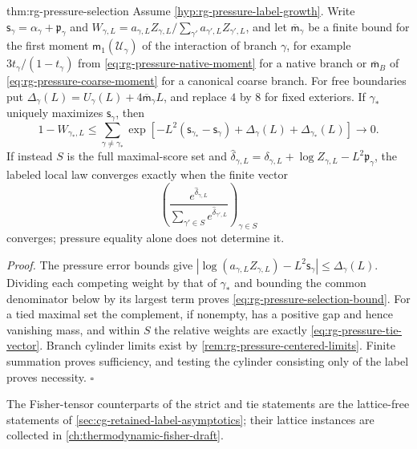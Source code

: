{thm:rg-pressure-selection}
Assume \cref{hyp:rg-pressure-label-growth}. Write
$\mathsf s_\gamma=\alpha_\gamma+\mathfrak p_\gamma$ and
$W_{\gamma,L}=a_{\gamma,L}Z_{\gamma,L}/\sum_{\gamma'}a_{\gamma',L}Z_{\gamma',L}$,
and let $\overline{\mathsf m}_\gamma$ be a finite bound for the first moment
$\mathsf m_1(\mathscr U_\gamma)$ of the interaction of branch $\gamma$, for example
$3t_\gamma/(1-t_\gamma)$ from \cref{eq:rg-pressure-native-moment} for a
native branch or $\overline{\mathsf m}_B$ of
\cref{eq:rg-pressure-coarse-moment} for a canonical coarse branch. For free
boundaries put $\Delta_\gamma(L)=U_\gamma(L)+4\overline{\mathsf m}_\gamma L$,
and replace $4$ by $8$ for fixed exteriors. If $\gamma_*$ uniquely maximizes
$\mathsf s_\gamma$, then
\begin{equation}
 1-W_{\gamma_*,L}\leq\sum_{\gamma\ne\gamma_*}
 \exp\left[-L^2(\mathsf s_{\gamma_*}-\mathsf s_\gamma)
                  +\Delta_\gamma(L)+\Delta_{\gamma_*}(L)\right]\longrightarrow0.
 \label{eq:rg-pressure-selection-bound}
\end{equation}
If instead $S$ is the full maximal-score set and
$\widehat\delta_{\gamma,L}=\delta_{\gamma,L}+\log Z_{\gamma,L}-L^2\mathfrak p_\gamma$,
the labeled local law converges exactly when the finite vector
\begin{equation}
 \left(\frac{e^{\widehat\delta_{\gamma,L}}}
 {\sum_{\gamma'\in S}e^{\widehat\delta_{\gamma',L}}}\right)_{\gamma\in S}
 \label{eq:rg-pressure-tie-vector}
\end{equation}
converges; pressure equality alone does not determine it.

\noindent\emph{Proof.}
The pressure error bounds give
$|\log(a_{\gamma,L}Z_{\gamma,L})-L^2\mathsf s_\gamma|\leq\Delta_\gamma(L)$.
Dividing each competing weight by that of $\gamma_*$ and bounding the common
denominator below by its largest term proves
\cref{eq:rg-pressure-selection-bound}. For a tied maximal set the complement,
if nonempty, has a positive gap and hence vanishing mass, and within $S$ the
relative weights are exactly \cref{eq:rg-pressure-tie-vector}. Branch
cylinder limits exist by \cref{rem:rg-pressure-centered-limits}. Finite
summation proves sufficiency, and testing the cylinder consisting only of the
label proves necessity. $\square$

The Fisher-tensor counterparts of the strict and tie statements are the
lattice-free statements of \cref{sec:cg-retained-label-asymptotics}; their
lattice instances are collected in \cref{ch:thermodynamic-fisher-draft}.

